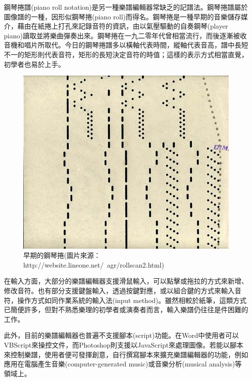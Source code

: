 \documentclass[12pt,a4paper,oneside]{report}
\begin{document}
鋼琴捲譜(piano roll notation)是另一種樂譜編輯器常缺乏的記譜法。鋼琴捲譜屬於圖像譜的一種，因形似鋼琴捲(piano roll)而得名。鋼琴捲是一種早期的音樂儲存媒介，藉由在紙捲上打孔來記錄音符的資訊，由以氣壓驅動的自奏鋼琴(player piano)讀取並將樂曲彈奏出來。鋼琴捲在一九二零年代曾相當流行，而後逐漸被收音機和唱片所取代\cite{thePiano}。今日的鋼琴捲譜多以橫軸代表時間，縱軸代表音高，譜中長短不一的矩形則代表音符，矩形的長短決定音符的時值；這樣的表示方式相當直覺，初學者也易於上手。

\begin{figure}[htb]
\centering
\includegraphics[scale=0.3]{img/piano_roll.png}
\caption{ 早期的鋼琴捲(圖片來源：http://website.lineone.net/~agr/rollscan2.html) }
\label{fig:piano_roll} %
\end{figure}


在輸入方面，大部分的樂譜編輯器支援滑鼠輸入，可以點擊或拖拉的方式來新增、修改音符。也有部分支援鍵盤輸入，透過按鍵對應，或以組合鍵的方式來輸入音符，操作方式如同作業系統的輸入法(input method)。雖然相較於紙筆，這類方式已簡便許多，但對不熟悉樂理的初學者或演奏者而言，輸入樂譜仍往往是件困難的工作。

此外，目前的樂譜編輯器也普遍不支援腳本(script)功能。在Word中使用者可以VBScript來操控文件，而Photoshop則支援以JavaScript來處理圖像。若能以腳本來控制樂譜，使用者便可發揮創意，自行撰寫腳本來擴充樂譜編輯器的功能，例如應用在電腦產生音樂(computer-generated music)或音樂分析(musical analysis)等領域上。
\end{document}
